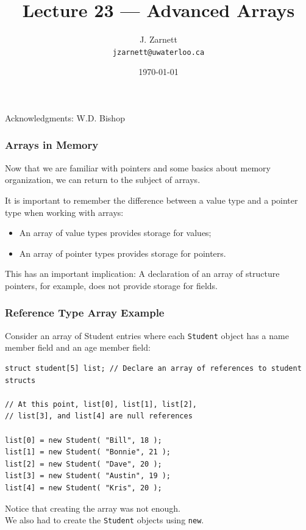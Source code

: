 

\title{Lecture 23 --- Advanced Arrays }

\author{J. Zarnett\\
\texttt{jzarnett@uwaterloo.ca}}
\date{\today}



\begin{frame}
  \titlepage
  
  \begin{center}
  \small{Acknowledgments: W.D. Bishop}
  \end{center}
\end{frame}


\begin{frame}
\frametitle{Arrays in Memory}
Now that we are familiar with pointers and some basics about memory organization, we can return to the subject of arrays.

It is important to remember the difference between a value type and a pointer type when working with arrays:\\
\begin{itemize}
	\item An array of value types provides storage for values;\\
	\item An array of pointer types provides storage for pointers.
\end{itemize}

This has an important implication:
A declaration of an array of structure pointers, for example, does not provide storage for fields.

\end{frame}

\begin{frame}[fragile]
\frametitle{Reference Type Array Example}

Consider an array of Student entries where each \texttt{Student} object has a name member field and an age member field:

{\scriptsize
\begin{verbatim}
struct student[5] list;	// Declare an array of references to student structs
	
// At this point, list[0], list[1], list[2], 
// list[3], and list[4] are null references

list[0] = new Student( "Bill", 18 );
list[1] = new Student( "Bonnie", 21 );
list[2] = new Student( "Dave", 20 );
list[3] = new Student( "Austin", 19 );
list[4] = new Student( "Kris", 20 );
\end{verbatim}
}
Notice that creating the array was not enough.\\
\quad We also had to create the \texttt{Student} objects using \texttt{new}.

\end{frame}


